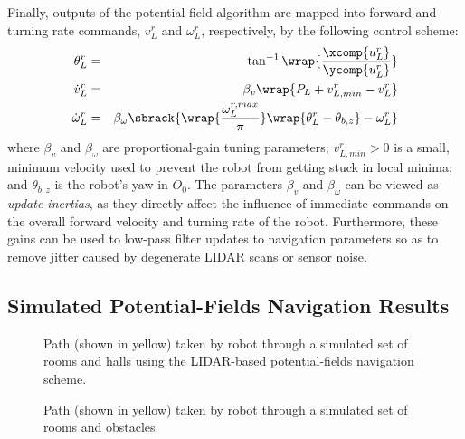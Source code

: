 			Finally, outputs of the potential field algorithm are mapped into forward and turning rate commands, ${v}_{L}^{r}$ and $\omega_{L}^{r}$, respectively, by the following control scheme:
				\begin{eqnarray}
					\theta_{L}^{r} 			&=& \tan^{-1}\wrap{ \frac{ \xcomp{{u}^{r}_{L}} }{ \ycomp{{u}^{r}_{L}} } } \nonumber\\
					\dot{v}_{L}^{r} 		&=& \beta_{v} \wrap{ P_{L} + v_{L,min}^{r} - v_{L}^{r} } \nonumber \\
					\dot{\omega}_{L}^{r} 	&=& \beta_{\omega} \sbrack{ \wrap{ \frac{ \omega_{L}^{r,max} }{\pi} } \wrap{  \theta_{L}^{r} - \theta_{b,z} } - \omega_{L}^{r} }
				\end{eqnarray}
			where $\beta_{v}$ and $\beta_{\omega}$ are proportional-gain tuning parameters; $v_{L,min}^{r}>0$ is a small, minimum velocity used to prevent the robot from getting stuck in local minima; and $\theta_{b,z}$ is the robot's yaw in $O_{0}$. The parameters $\beta_{v}$ and $\beta_{\omega}$ can be viewed as \emph{update-inertias}, as they directly affect the influence of immediate commands on the overall forward velocity and turning rate of the robot. Furthermore, these gains can be used to low-pass filter updates to navigation parameters so as to remove jitter caused by degenerate LIDAR scans or sensor noise.


		\subsection{Simulated Potential-Fields Navigation Results}

				\begin{figure}[!h]
					\centering
					\caption{Path (shown in yellow) taken by robot through a simulated set of rooms and halls using the LIDAR-based potential-fields navigation scheme.}
					\label{fig::potential_field_results}
				\end{figure}
				\begin{figure}[!h]
					\centering
					\caption{Path (shown in yellow) taken by robot through a simulated set of rooms and obstacles.}
					\label{fig::potential_field_results_obstacles}
				\end{figure}
		
